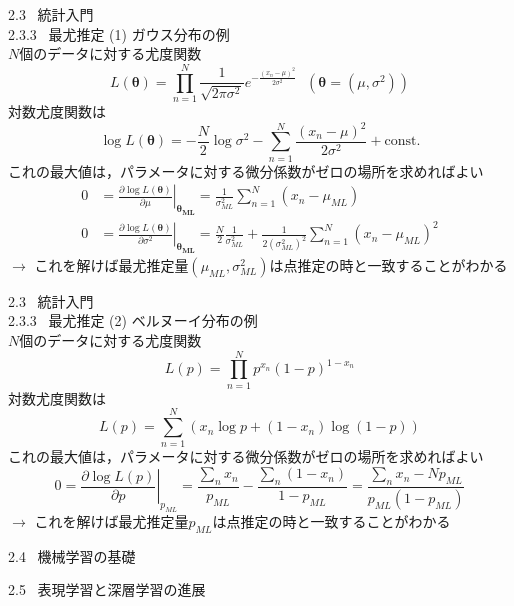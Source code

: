 \documentclass[dvipdfmx,8pt]{beamer}
\begin{document}
  \begin{frame}[t]{2.3 \ 統計入門 \\ \normalsize{2.3.3 \ 最尤推定}}
    (1) ガウス分布の例\\
    $N$個のデータに対する尤度関数
    \begin{equation*}
      L(\bm{\theta}) = \prod_{n=1}^{N}\frac{1}{\sqrt{2\pi\sigma^2}}e^{-\frac{(x_n - \mu)^2}{2\sigma^2}} \ \ \ (\bm{\theta}=(\mu,\sigma^2))
    \end{equation*}
    対数尤度関数は
    \begin{equation*}
      \log L(\bm{\theta}) = -\frac{N}{2}\log \sigma^2 -\sum_{n=1}^{N}\frac{(x_n-\mu)^2}{2\sigma^2}+\text{const.}
    \end{equation*}
    これの最大値は，パラメータに対する微分係数がゼロの場所を求めればよい
    \begin{align*}
      0 &= \left.\frac{\partial \log L(\bm{\theta})}{\partial \mu}\right|_{\bm{\theta_{ML}}} = \frac{1}{\sigma^2_{ML}}\sum_{n=1}^{N}(x_n - \mu_{ML})\\
      0 &= \left.\frac{\partial \log L(\bm{\theta})}{\partial \sigma^2}\right|_{\bm{\theta_{ML}}} = \frac{N}{2}\frac{1}{\sigma^2_{ML}} + \frac{1}{2(\sigma^2_{ML})^2}\sum_{n=1}^{N}(x_n - \mu_{ML})^2 
    \end{align*}
    $\rightarrow$ これを解けば最尤推定量$(\mu_{ML},\sigma^2_{ML})$は点推定の時と一致することがわかる
  \end{frame}

  \begin{frame}[t]{2.3 \ 統計入門 \\ \normalsize{2.3.3 \ 最尤推定}}
    (2) ベルヌーイ分布の例\\
    $N$個のデータに対する尤度関数
    \begin{equation*}
      L(p) = \prod_{n=1}^{N}p^{x_n}(1-p)^{1-x_n}
    \end{equation*}
    対数尤度関数は
    \begin{equation*}
      L(p) = \sum_{n=1}^{N}(x_n \log p+(1-x_n)\log (1-p))
    \end{equation*}
    これの最大値は，パラメータに対する微分係数がゼロの場所を求めればよい
    \begin{equation*}
      0 = \left.\frac{\partial \log L(p)}{\partial p}\right|_{p_{ML}} = \frac{\sum_n x_n}{p_{ML}}-\frac{\sum_n (1-x_n)}{1-p_{ML}} = \frac{\sum_n x_n - Np_{ML}}{p_{ML}(1-p_{ML})}
    \end{equation*}
    $\rightarrow$ これを解けば最尤推定量$p_{ML}$は点推定の時と一致することがわかる
  \end{frame}

  \begin{frame}{2.4 \ 機械学習の基礎}
    

  \end{frame}

  \begin{frame}{2.5 \ 表現学習と深層学習の進展}
    
  \end{frame}
\end{document}
